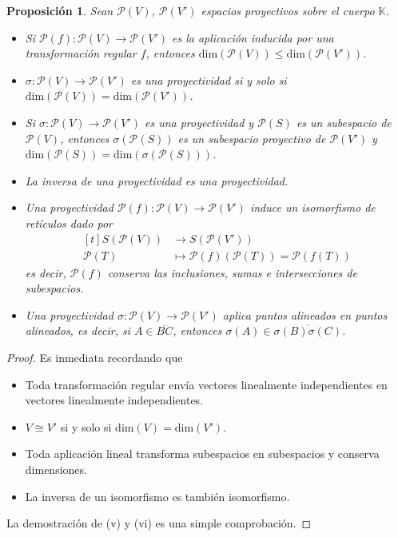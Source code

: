 \documentclass[12pt]{report}
\newtheorem{proposition}{Proposición}[chapter]
\theoremstyle{definition}
\theoremstyle{definition}
\theoremstyle{remark}
\begin{document}
\begin{proposition}
Sean $\mathcal{P}(V)$, $\mathcal{P}(V')$ espacios proyectivos sobre el cuerpo $\mathbb{K}$.
    \begin{itemize}
        \item[(i)] Si $\mathcal{P}(f) \colon \mathcal{P}(V) \to \mathcal{P}(V')$ es la aplicación inducida por una transformación regular $f$, entonces $\mathrm{dim}(\mathcal{P}(V)) \leq \mathrm{dim}(\mathcal{P}(V'))$.
        \item[(ii)] $\sigma \colon \mathcal{P}(V) \to \mathcal{P}(V')$ es una proyectividad si y solo si $\mathrm{dim}(\mathcal{P}(V)) = \mathrm{dim}(\mathcal{P}(V'))$.
        \item[(iii)] Si $\sigma \colon \mathcal{P}(V) \to \mathcal{P}(V')$ es una proyectividad  y $\mathcal{P}(S)$ es un subespacio de $\mathcal{P}(V)$, entonces $\sigma(\mathcal{P}(S))$ es un subespacio proyectivo de $\mathcal{P}(V')$ y $\mathrm{dim}(\mathcal{P}(S)) = \mathrm{dim}(\sigma(\mathcal{P}(S)))$.
        \item[(iv)] La inversa de una proyectividad es una proyectividad.
        \item[(v)] Una proyectividad $\mathcal{P}(f) \colon \mathcal{P}(V) \to \mathcal{P}(V')$ induce un isomorfismo de retículos dado por 
        \[
        \begin{aligned}[t]
        S(\mathcal{P}(V)) &\longrightarrow  S(\mathcal{P}(V')) \\
        \mathcal{P}(T) &\longmapsto \mathcal{P}(f)(\mathcal{P}(T)) = \mathcal{P}(f(T))
        \end{aligned}
        \]
        es decir, $\mathcal{P}(f)$ conserva las inclusiones, sumas e intersecciones de subespacios.
        \item[(vi)] Una proyectividad $\sigma \colon \mathcal{P}(V) \to \mathcal{P}(V')$ aplica puntos alineados en puntos alineados, es decir, si $A \in \overline{BC}$, entonces $\sigma(A) \in \overline{\sigma(B)\sigma(C)}$.
    \end{itemize}
\end{proposition}

\begin{proof}
Es inmediata recordando que
\begin{itemize}
    \item[(i)] Toda transformación regular envía vectores linealmente independientes en vectores linealmente independientes.
    \item[(ii)]$V \cong V'$ si y solo si $\mathrm{dim}(V) = \mathrm{dim}(V')$.
    \item[(iii)] Toda aplicación lineal transforma subespacios en subespacios y conserva dimensiones.
    \item[(iv)] La inversa de un isomorfismo es también isomorfismo.
\end{itemize}
La demostración de (v) y (vi) es una simple comprobación.
\end{proof}
\end{document}
